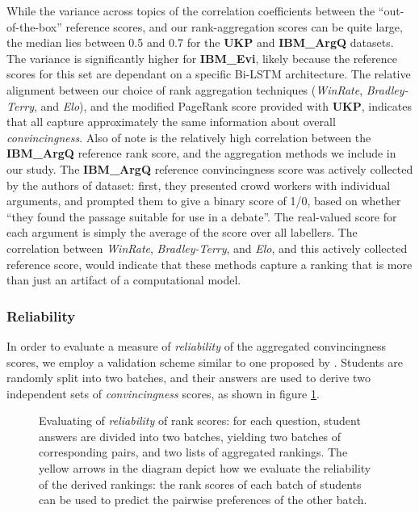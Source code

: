 \documentclass[notitlepage,12pt]{jedm}
\begin{document}
While the variance across topics of the correlation coefficients between the 
``out-of-the-box'' reference scores, and our rank-aggregation scores can be 
quite large, the median lies between 0.5 and 0.7 for the \textbf{UKP} and 
\textbf{IBM\_ArgQ} datasets.
The variance is significantly higher for \textbf{IBM\_Evi}, likely because the 
reference scores for this set are dependant on a specific Bi-LSTM architecture.
The relative alignment between our choice of rank aggregation techniques 
(\textit{WinRate}, \textit{Bradley-Terry}, and \textit{Elo}), and the modified 
PageRank score provided with \textbf{UKP}, indicates that all capture 
approximately the same information about overall \textit{convincingness}.
Also of note is the relatively high correlation between the \textbf{IBM\_ArgQ} 
reference rank score, and the aggregation methods we include in our study. 
The \textbf{IBM\_ArgQ} reference convincingness score was actively collected by 
the authors of dataset: first, they presented crowd workers with individual 
arguments, and prompted them to give a binary score of 1/0, based on whether 
``they found the passage suitable for use in a debate''. 
The real-valued score for each argument is simply the average of the score over 
all labellers.
The correlation between \textit{WinRate}, \textit{Bradley-Terry}, and 
\textit{Elo}, and this actively collected reference score, would indicate that 
these methods capture a ranking that is more than just an artifact of a 
computational model.
   
\subsubsection{Reliability}
In order to evaluate a measure of \textit{reliability} of the aggregated 
convincingness scores, we employ a validation scheme similar to one proposed by 
.
Students are randomly split into two batches, and their answers are used to 
derive two independent sets of \textit{convincingness} scores, as shown in 
figure \ref{fig:evaluate_rankings}. 


\begin{figure}[H]
	\centering
	\scalebox{0.5}{}
	\caption{
		Evaluating of \textit{reliability} of rank scores: for each question, 
		student answers are divided into two batches, yielding two batches of 
		corresponding pairs, and two lists of aggregated rankings.
		The yellow arrows in the diagram depict how we evaluate the reliability 
		of the derived rankings: the rank scores of each batch of students can 
		be used to predict the pairwise preferences of the other batch.
	}
	\label{fig:evaluate_rankings}
\end{figure}
\end{document}
